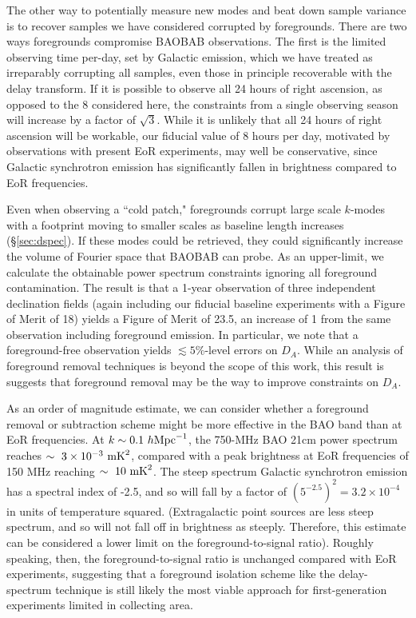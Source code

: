 \documentclass[10pt,iop]{emulateapj}
\begin{document}
The other way to potentially measure new modes and beat down sample variance is to recover samples
we have considered corrupted by foregrounds.  There are two ways foregrounds compromise BAOBAB
observations.  The first is the limited observing time per-day, set by Galactic emission,
which we have treated as irreparably corrupting all samples, even those in principle
recoverable with the delay transform.  If it is possible to observe all 24 hours of right ascension,
as opposed to the 8 considered here, the constraints from a single observing season will increase
by a factor of $\sqrt3$.  While it is unlikely that all 24 hours of right ascension
will be workable, our fiducial value of 8 hours per day, motivated by observations
with present EoR experiments, may well
be conservative, since Galactic synchrotron emission has significantly fallen in brightness
compared to EoR frequencies.

Even when observing a ``cold patch," foregrounds corrupt large scale $k$-modes with a 
footprint moving to smaller scales as baseline length increases (\S\ref{sec:dspec}).  If these
modes could be retrieved, they could significantly increase the volume of Fourier space
that BAOBAB can probe.  As an upper-limit, we calculate the obtainable power spectrum constraints 
ignoring all foreground contamination.  The result is that a 1-year observation of
three independent declination fields
(again including our fiducial baseline experiments with a Figure of Merit of 18) yields a Figure
of Merit of 23.5, an increase of 1 from the same observation including foreground emission.  
In particular, we note that a foreground-free observation yields
$\lesssim5\%$-level errors on $D_A$.  While
an analysis of foreground removal techniques is beyond the scope of this work, this result is
suggests that foreground removal may be the way to improve constraints on $D_A$.

As an order of magnitude estimate, we can  consider whether a foreground removal or
subtraction scheme might be more effective in the BAO band than at EoR frequencies.  At 
$k\sim0.1~h\rm{Mpc}^{-1}$, the 750-MHz BAO 21cm power spectrum reaches $\sim~3\times10^{-3}~\rm{mK}^2$,
compared with a peak brightness at EoR frequencies of 150 MHz reaching $\sim~10~\rm{mK}^2$.  
The steep spectrum Galactic synchrotron emission has a spectral index of -2.5, and so will fall
by a factor of $(5^{-2.5})^2 = 3.2\times10^{-4}$ in units of temperature squared.  (Extragalactic point sources are
less steep spectrum, and so will not fall off in brightness as steeply.  Therefore, this estimate
can be considered a lower limit on the foreground-to-signal ratio).  
Roughly speaking, then, the foreground-to-signal ratio is unchanged compared with EoR experiments,
suggesting
that a foreground isolation scheme like the delay-spectrum technique is still likely
the most viable approach for first-generation experiments limited in collecting area.
\end{document}
